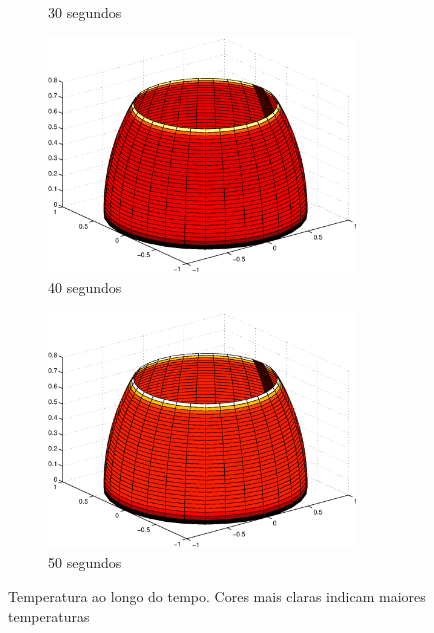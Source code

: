 \documentclass{article}
\begin{document}
\begin{figure}
\begin{subfigure}[b]{0.45\textwidth}
				\caption{30 segundos}
			\end{subfigure}
			\begin{subfigure}[b]{0.45\textwidth}
				\includegraphics[width=0.9\textwidth]{time-40.eps}
				\caption{40 segundos}
			\end{subfigure}
			\begin{subfigure}[b]{0.45\textwidth}
				\includegraphics[width=0.9\textwidth]{time-50.eps}
				\caption{50 segundos}
			\end{subfigure}
			\caption{Temperatura ao longo do tempo. Cores mais claras indicam maiores temperaturas}
			\label{fig:simulacao}
		\end{figure}
	
	
\end{document}
